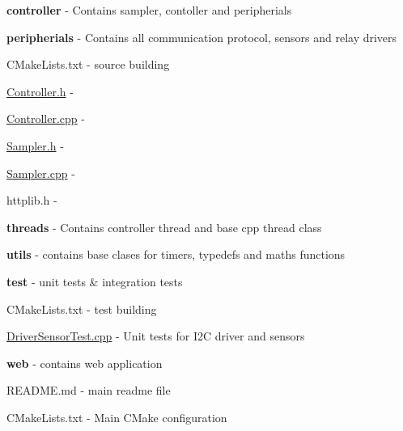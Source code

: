 \begin{DoxyItemize}
\begin{DoxyItemize}
\begin{DoxyItemize}
\begin{DoxyItemize}
\item {\bfseries controller} -\/ Contains sampler, contoller and peripherials
\begin{DoxyItemize}
\item {\bfseries peripherials} -\/ Contains all communication protocol, sensors and relay drivers
\begin{DoxyItemize}
\item C\+Make\+Lists.\+txt -\/ source building
\end{DoxyItemize}
\item \hyperlink{Controller_8h}{Controller.\+h} -\/
\item \hyperlink{Controller_8cpp}{Controller.\+cpp} -\/
\item \hyperlink{Sampler_8h}{Sampler.\+h} -\/
\item \hyperlink{Sampler_8cpp}{Sampler.\+cpp} -\/
\item httplib.\+h -\/
\end{DoxyItemize}
\item {\bfseries threads} -\/ Contains controller thread and base cpp thread class
\item {\bfseries utils} -\/ contains base clases for timers, typedefs and maths functions
\end{DoxyItemize}
\item {\bfseries test} -\/ unit tests \& integration tests
\begin{DoxyItemize}
\item C\+Make\+Lists.\+txt -\/ test building
\item \hyperlink{DriverSensorTest_8cpp}{Driver\+Sensor\+Test.\+cpp} -\/ Unit tests for I2C driver and sensors
\end{DoxyItemize}
\item {\bfseries web} -\/ contains web application
\end{DoxyItemize}
\item R\+E\+A\+D\+M\+E.\+md -\/ main readme file
\item C\+Make\+Lists.\+txt -\/ Main C\+Make configuration 
\end{DoxyItemize}
\end{DoxyItemize}